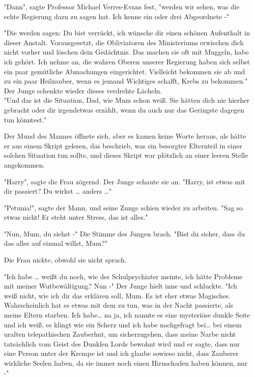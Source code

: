 {"Dann", sagte Professor Michael Verres-Evans fest, "werden wir sehen, was die echte Regierung dazu zu sagen hat. Ich kenne ein oder drei Abgeordnete -"

"Die werden sagen: Du bist verrückt, ich wünsche dir einen schönen Aufenthalt in dieser Anstalt. Vorausgesetzt, die Obliviatoren des Ministeriums erwischen dich nicht vorher und löschen dein Gedächtnis. Das machen sie oft mit Muggeln, habe ich gehört. Ich nehme an, die wahren Oberen unserer Regierung haben sich selbst ein paar gemütliche Abmachungen eingerichtet. Vielleicht bekommen sie ab und zu ein paar Heilzauber, wenn es jemand Wichtiges schafft, Krebs zu bekommen."\\ Der Junge schenkte wieder dieses verdrehte Lächeln.\\ "Und das ist die Situation, Dad, wie Mum schon weiß. Sie hätten dich nie hierher gebracht oder dir irgendetwas erzählt, wenn du auch nur das Geringste dagegen tun könntest."

Der Mund des Mannes öffnete sich, aber es kamen keine Worte heraus, als hätte er aus einem Skript gelesen, das beschrieb, was ein besorgter Elternteil in einer solchen Situation tun sollte, und dieses Skript war plötzlich an einer leeren Stelle angekommen.

"Harry", sagte die Frau zögernd. Der Junge schaute sie an. "Harry, ist etwas mit dir passiert? Du wirkst … anders …"

"Petunia!", sagte der Mann, und seine Zunge schien wieder zu arbeiten. "Sag so etwas nicht! Er steht unter Stress, das ist alles."

"Nun, Mum, du siehst -" Die Stimme des Jungen brach. "Bist du sicher, dass du das alles auf einmal willst, Mum?"

Die Frau nickte, obwohl sie nicht sprach.

"Ich habe … weißt du noch, wie der Schulpsychiater meinte, ich hätte Probleme mit meiner Wutbewältigung? Nun -" Der Junge hielt inne und schluckte. "Ich weiß nicht, wie ich dir das erklären soll, Mum. Es ist eher etwas Magisches. Wahrscheinlich hat es etwas mit dem zu tun, was in der Nacht passierte, als meine Eltern starben. Ich habe… na ja, ich nannte es eine mysteriöse dunkle Seite und ich weiß, es klingt wie ein Scherz und ich habe nachgefragt bei… bei einem uralten telepathischen Zauberhut, um sicherzugehen, dass meine Narbe nicht tatsächlich vom Geist des Dunklen Lords bewohnt wird und er sagte, dass nur eine Person unter der Krempe ist und ich glaube sowieso nicht, dass Zauberer wirkliche Seelen haben, da sie immer noch einen Hirnschaden haben können, nur -"

}
